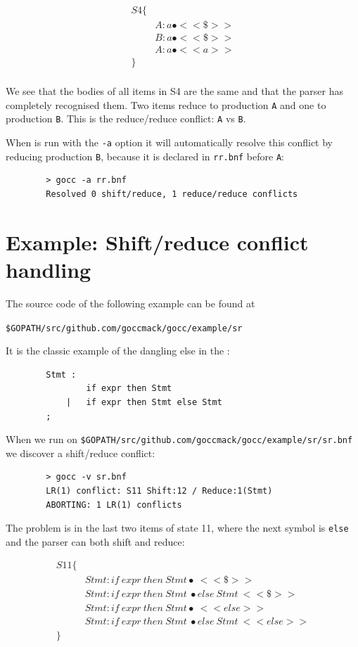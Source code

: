 \documentclass[12pt]{article}
\begin{document}
	\[
		\begin{array}{ll}
			S4 \{ \\
			    & A : a\bullet  <<\$>> \\
			    & B : a\bullet  <<\$>> \\
			    & A : a\bullet  <<a>> \\
			\} \\
		\end{array}
	\]

	We see that the bodies of all items in S4 are the same and that the parser has completely recognised them. Two items reduce to production \verb|A| and one to production \verb|B|. This is the reduce/reduce conflict: \verb|A| vs \verb|B|.

	When \gocc is run with the \verb|-a| option it will automatically resolve this conflict by reducing production \verb|B|, because it is declared in \verb|rr.bnf| before \verb|A|:

	\begin{verbatim}
		> gocc -a rr.bnf
		Resolved 0 shift/reduce, 1 reduce/reduce conflicts
	\end{verbatim}

\section{Example: Shift/reduce conflict handling} \label{sec:example sr}
	The source code of the following example can be found at

	\verb|$GOPATH/src/github.com/goccmack/gocc/example/sr|

	It is the classic example of the dangling else in the \Clang:

	\begin{verbatim}
		Stmt :
		        if expr then Stmt
		    |   if expr then Stmt else Stmt
		;
	\end{verbatim}

	When we run \gocc on \verb|$GOPATH/src/github.com/goccmack/gocc/example/sr/sr.bnf| we discover a shift/reduce conflict:

	\begin{verbatim}
		> gocc -v sr.bnf
		LR(1) conflict: S11 Shift:12 / Reduce:1(Stmt)
		ABORTING: 1 LR(1) conflicts
	\end{verbatim}

	The problem is in the last two items of state 11, where the next symbol is \verb|else| and the parser can both shift and reduce:

	\[
		\begin{array}{ll}
			S11 \{ \\
			  & Stmt : if\ expr\ then\ Stmt\bullet\ <<\$>> \\
			  & Stmt : if\ expr\ then\ Stmt\ \bullet else\ Stmt\ <<\$>> \\
			  & Stmt : if\ expr\ then\ Stmt \bullet\ <<else>> \\
			  & Stmt : if\ expr\ then\ Stmt\ \bullet else\ Stmt\ <<else>> \\
			\} \\
		\end{array}
	\]
\end{document}
